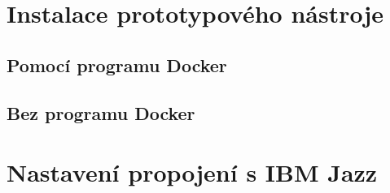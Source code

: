 \documentclass[czech,master]{diploma}
\begin{document}
\chapter{Instalace prototypového nástroje}
\section{Pomocí programu Docker}

\section{Bez programu Docker}

\chapter{Nastavení propojení s IBM Jazz}
\end{document}
